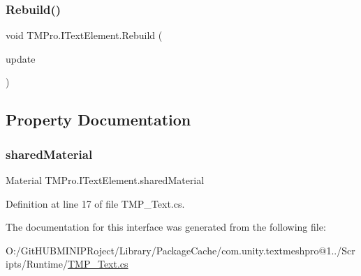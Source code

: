 \mbox{\label{interface_t_m_pro_1_1_i_text_element_a08e118a37098ad9a0b5779368344c83d}} 
\subsubsection{\texorpdfstring{Rebuild()}{Rebuild()}}
{\footnotesize\ttfamily void T\+M\+Pro.\+I\+Text\+Element.\+Rebuild (\begin{DoxyParamCaption}\item[{Canvas\+Update}]{update }\end{DoxyParamCaption})}



\subsection{Property Documentation}
\mbox{\label{interface_t_m_pro_1_1_i_text_element_a87a0a40389be0c5fd0a9e4dd485e9665}} 
\subsubsection{\texorpdfstring{sharedMaterial}{sharedMaterial}}
{\footnotesize\ttfamily Material T\+M\+Pro.\+I\+Text\+Element.\+shared\+Material\hspace{0.3cm}{\ttfamily [get]}}



Definition at line 17 of file T\+M\+P\+\_\+\+Text.\+cs.



The documentation for this interface was generated from the following file\+:\begin{DoxyCompactItemize}
\item 
O\+:/\+Git\+H\+U\+B\+M\+I\+N\+I\+P\+Roject/\+Library/\+Package\+Cache/com.\+unity.\+textmeshpro@1../\+Scripts/\+Runtime/\mbox{\hyperlink{_t_m_p___text_8cs}{T\+M\+P\+\_\+\+Text.\+cs}}\end{DoxyCompactItemize}
